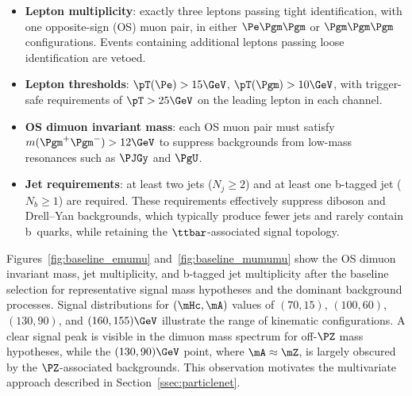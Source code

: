 \begin{itemize}
\item \textbf{Lepton multiplicity}: exactly three leptons passing tight identification, with one opposite-sign (OS) muon pair, in either $\Pe\Pgm\Pgm$ or $\Pgm\Pgm\Pgm$ configurations. Events containing additional leptons passing loose identification are vetoed.
\item \textbf{Lepton \pT thresholds}: $\pT(\Pe) > 15\GeV$, $\pT(\Pgm) > 10\GeV$, with trigger-safe requirements of $\pT > 25\GeV$ on the leading lepton in each channel.
\item \textbf{OS dimuon invariant mass}: each OS muon pair must satisfy $m(\Pgm^+\Pgm^-) > 12\GeV$ to suppress backgrounds from low-mass resonances such as $\PJGy$ and $\PgU$.
\item \textbf{Jet requirements}: at least two jets ($N_j \geq 2$) and at least one b-tagged jet ($N_b \geq 1$) are required. These requirements effectively suppress diboson and Drell--Yan backgrounds, which typically produce fewer jets and rarely contain b~quarks, while retaining the $\ttbar$-associated signal topology.
\end{itemize}

Figures~\ref{fig:baseline_emumu} and~\ref{fig:baseline_mumumu} show the OS dimuon invariant mass, jet multiplicity, and b-tagged jet multiplicity after the baseline selection for representative signal mass hypotheses and the dominant background processes. Signal distributions for $(\mHc, \mA)$ values of $(70, 15)$, $(100, 60)$, $(130, 90)$, and $(160, 155)\GeV$ illustrate the range of kinematic configurations. A clear signal peak is visible in the dimuon mass spectrum for off-$\PZ$ mass hypotheses, while the $(130, 90)\GeV$ point, where $\mA \approx \mZ$, is largely obscured by the $\PZ$-associated backgrounds. This observation motivates the multivariate approach described in Section~\ref{ssec:particlenet}.

